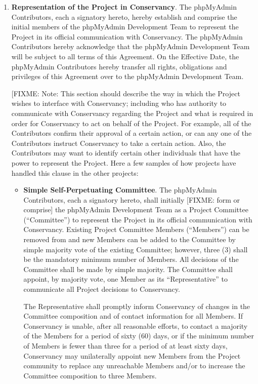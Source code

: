\documentclass[letterpaper,12pt]{article}
\newcommand{\signatories}{phpMyAdmin Contributors\xspace}
\newcommand{\leadershipbody}{phpMyAdmin Development Team\xspace}
\begin{document}
\begin{enumerate}[label=\arabic*.,ref=\S~\arabic*]
\item \textbf{Representation of the Project in Conservancy}. \label{Representation}The
\signatories, each a signatory hereto, hereby establish and comprise
the initial members of the \leadershipbody
to represent the Project in its official communication with Conservancy.
The \signatories hereby acknowledge that the \leadershipbody
will be subject to all terms of this Agreement.
On the Effective Date, the \signatories hereby transfer all
rights, obligations and privileges of this Agreement over to the
\leadershipbody.

[FIXME: Note: This section should describe the way in which the
Project wishes to interface with Conservancy; including who has
authority to communicate with Conservancy regarding the Project
and what is required in order for Conservancy to act on behalf
of the Project. For example, all of the Contributors confirm their
approval of a certain action, or can any one of the Contributors instruct
Conservancy to take a certain action. Also, the Contributors may
want to identify certain other individuals that have the power to
represent the Project. Here a few samples of how projects have handled
this clause in the other projects:

\begin{itemize}
\item \textbf{Simple Self-Perpetuating Committee}. The \signatories,
each a signatory hereto, shall initially [FIXME: form or comprise]
the \leadershipbody as a Project Committee (``Committee'')
to represent the Project in its official communication with Conservancy.
Existing Project Committee Members (``Members'') can be removed
from and new Members can be added to the Committee by simple majority
vote of the existing Committee; however, three (3) shall be the mandatory
minimum number of Members. All decisions of the Committee shall be
made by simple majority. The Committee shall appoint, by majority
vote, one Member as its ``Representative'' to communicate all Project
decisions to Conservancy.


The Representative shall promptly inform Conservancy of changes in
the Committee composition and of contact information for all Members.
If Conservancy is unable, after all reasonable efforts, to contact
a majority of the Members for a period of sixty (60) days, or if the
minimum number of Members is fewer than three for a period of at least
sixty days, Conservancy may unilaterally appoint new Members from
the Project community to replace any unreachable Members and/or to
increase the Committee composition to three Members.


\end{itemize}
\end{enumerate}
\end{document}
